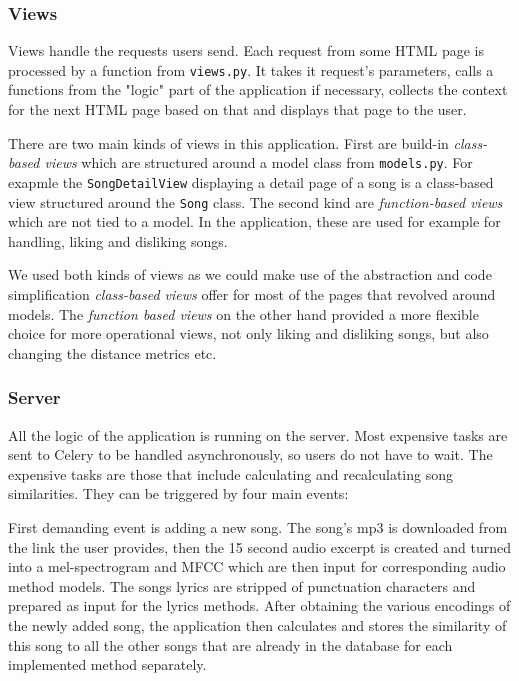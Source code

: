 \subsubsection{Views}
Views handle the requests users send. Each request from some HTML page is processed by a function from \texttt{views.py}. It takes it request's parameters, calls a functions from the "logic" part of the application if necessary, collects the context for the next HTML page based on that and displays that page to the user. 

There are two main kinds of views in this application. First are build-in \textit{class-based views} which are structured around a model class from \texttt{models.py}. For exapmle the \texttt{SongDetailView} displaying a detail page of a song is a class-based view structured around the \texttt{Song} class. The second kind are \textit{function-based views} which are not tied to a model. In the application, these are used for example for handling, liking and disliking songs. 

We used both kinds of views as we could make use of the abstraction and code simplification \textit{class-based views} offer for most of the pages that revolved around models. The \textit{function based views} on the other hand provided a more flexible choice for more operational views, not only liking and disliking songs, but also changing the distance metrics etc. 

\subsubsection{Server}\label{sssec:server}

All the logic of the application is running on the server. Most expensive tasks are sent to Celery to be handled asynchronously, so users do not have to wait. 
The expensive tasks are those that include calculating and recalculating song similarities. They can be triggered by four main events:

First demanding event is adding a new song. The song's mp3 is downloaded from the link the user provides, then the 15 second audio excerpt is created and turned into a mel-spectrogram and MFCC which are then input for corresponding audio method models. The songs lyrics are stripped of punctuation characters and prepared as input for the lyrics methods. After obtaining the various encodings of the newly added song, the application then calculates and stores the similarity of this song to all the other songs that are already in the database for each implemented method separately.

